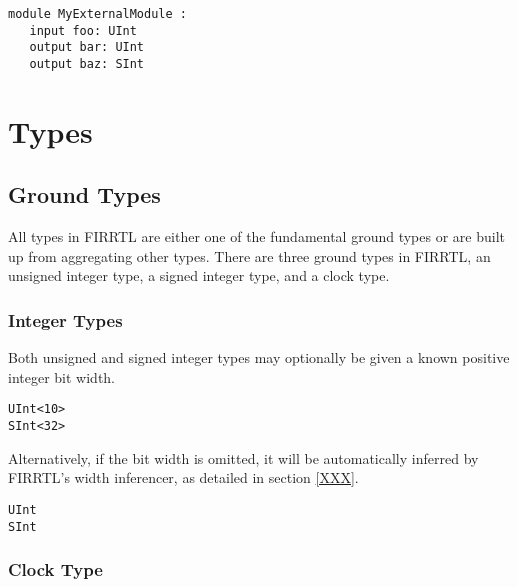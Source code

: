 \documentclass[12pt]{article}
\begin{document}
\begin{verbatim}
module MyExternalModule :
   input foo: UInt
   output bar: UInt
   output baz: SInt
\end{verbatim}  




\section{Types}

\subsection{Ground Types}

All types in FIRRTL are either one of the fundamental ground types or are built up from aggregating other types. There are three ground types in FIRRTL, an unsigned integer type, a signed integer type, and a clock type.

\subsubsection{Integer Types}

Both unsigned and signed integer types may optionally be given a known positive integer bit width.

\begin{verbatim}
UInt<10>
SInt<32>
\end{verbatim}  

Alternatively, if the bit width is omitted, it will be automatically inferred by FIRRTL's width inferencer, as detailed in section \ref{XXX}.

\begin{verbatim}
UInt
SInt
\end{verbatim}  

\subsubsection{Clock Type}
\end{document}
